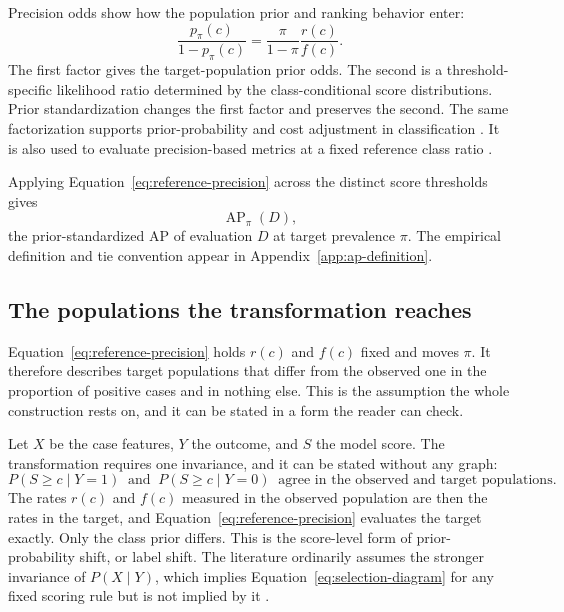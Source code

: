 \documentclass[11pt]{article}
\newcommand{\AP}{\operatorname{AP}}
\theoremstyle{remark}
\begin{document}
Precision odds show how the population prior and ranking behavior enter:
\begin{equation}
\frac{p_\pi(c)}{1-p_\pi(c)}
=
\frac{\pi}{1-\pi}
\frac{r(c)}{f(c)}.
\label{eq:precision-odds}
\end{equation}
The first factor gives the target-population prior odds. The second is a threshold-specific likelihood ratio determined by the class-conditional score distributions. Prior standardization changes the first factor and preserves the second. The same factorization supports prior-probability and cost adjustment in classification \cite{elkan2001foundations}. It is also used to evaluate precision-based metrics at a fixed reference class ratio \cite{siblini2020calibration,degeest2016online}.

Applying Equation~\eqref{eq:reference-precision} across the distinct score thresholds gives
\[
\AP_\pi(D),
\]
the prior-standardized AP of evaluation $D$ at target prevalence $\pi$. The empirical definition and tie convention appear in Appendix~\ref{app:ap-definition}.

\subsection{The populations the transformation reaches}
\label{sec:transport}

Equation~\eqref{eq:reference-precision} holds $r(c)$ and $f(c)$ fixed and moves $\pi$. It therefore describes target populations that differ from the observed one in the proportion of positive cases and in nothing else. This is the assumption the whole construction rests on, and it can be stated in a form the reader can check.

Let $X$ be the case features, $Y$ the outcome, and $S$ the model score. The transformation requires one invariance, and it can be stated without any graph:
\begin{equation}
P(S\geq c\mid Y=1)
\ \text{ and }\
P(S\geq c\mid Y=0)
\ \text{ agree in the observed and target populations.}
\label{eq:selection-diagram}
\end{equation}
The rates $r(c)$ and $f(c)$ measured in the observed population are then the rates in the target, and Equation~\eqref{eq:reference-precision} evaluates the target exactly. Only the class prior differs. This is the score-level form of prior-probability shift, or label shift. The literature ordinarily assumes the stronger invariance of $P(X\mid Y)$, which implies Equation~\eqref{eq:selection-diagram} for any fixed scoring rule but is not implied by it \cite{saerens2002adjusting,storkey2009training,lipton2018detecting}.
\end{document}
